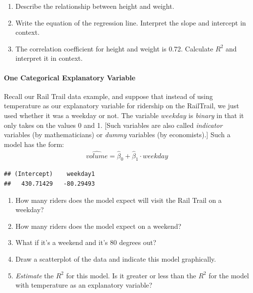 \documentclass[10pt]{article}\usepackage[]{graphicx}\usepackage[]{color}
\makeatletter
\newenvironment{kframe}{%
 \def\at@end@of@kframe{}%
 \ifinner\ifhmode%
  \def\at@end@of@kframe{\end{minipage}}%
  \begin{minipage}{\columnwidth}%
 \fi\fi%
 \def\FrameCommand##1{\hskip\@totalleftmargin \hskip-\fboxsep
 \colorbox{shadecolor}{##1}\hskip-\fboxsep
     \hskip-\linewidth \hskip-\@totalleftmargin \hskip\columnwidth}%
 \MakeFramed {\advance\hsize-\width
   \@totalleftmargin\z@ \linewidth\hsize
   \@setminipage}}%
 {\par\unskip\endMakeFramed%
 \at@end@of@kframe}
\newenvironment{knitrout}{}{} %
\makeatother
\begin{document}
\begin{enumerate}
  \itemsep0.7in
\item Describe the relationship between height and weight.
\item Write the equation of the regression line. Interpret the slope and intercept in context.
\item The correlation coefficient for height and weight is 0.72. Calculate $R^2$ and interpret it in context.
  \vspace{0.5in}
\end{enumerate}


\clearpage
\paragraph{One Categorical Explanatory Variable}

Recall our Rail Trail data example, and suppose that instead of using temperature as our explanatory variable for ridership on the RailTrail, we just used whether it was a weekday or not. The variable $weekday$ is \emph{binary} in that it only takes on the values 0 and 1. [Such variables are also called \emph{indicator} variables (by mathematicians) or \emph{dummy} variables (by economists).] Such a model has the form:
\begin{eqnarray*}
  \widehat{volume} = \hat{\beta}_0 + \hat{\beta}_1 \cdot weekday
\end{eqnarray*}

\begin{knitrout}\footnotesize
{}\color{fgcolor}\begin{kframe}
\begin{verbatim}
## (Intercept)    weekday1 
##   430.71429   -80.29493
\end{verbatim}
\end{kframe}
\end{knitrout}

\begin{enumerate}
  \itemsep0.5in
  \item How many riders does the model expect will visit the Rail Trail on a weekday? 
  \item How many riders does the model expect on a weekend? 
  \item What if it's a weekend and it's 80 degrees out?
  \item Draw a scatterplot of the data and indicate this model graphically.
  \vspace{1in}
  \item \emph{Estimate} the $R^2$ for this model. Is it greater or less than the $R^2$ for the model with temperature as an explanatory variable?
\end{enumerate}
\end{document}
